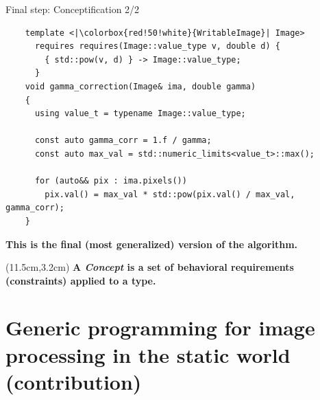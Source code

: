 \documentclass[12pt,aspectratio=169]{beamer}
\begin{document}
\begin{frame}[fragile]{Final step: Conceptification 2/2}
  \begin{verbatim}
    template <|\colorbox{red!50!white}{WritableImage}| Image>
      requires requires(Image::value_type v, double d) {
        { std::pow(v, d) } -> Image::value_type;
      }
    void gamma_correction(Image& ima, double gamma)
    {
      using value_t = typename Image::value_type;
    
      const auto gamma_corr = 1.f / gamma;
      const auto max_val = std::numeric_limits<value_t>::max();
    
      for (auto&& pix : ima.pixels())
        pix.val() = max_val * std::pow(pix.val() / max_val, gamma_corr);
    }
  \end{verbatim}
  \vfill
  \begin{center}\textbf{This is the final (most generalized) version of the algorithm.}\end{center}
  \begin{textblock*}{4cm}(11.5cm,3.2cm)
    \textbf{A \emph{Concept} is a set of behavioral requirements (constraints) applied to a type.}
  \end{textblock*}
  \pdfcomment[icon=Note]{   }
\end{frame}

%
%
%
\section[Generic programming for image processing in the static world (contribution)]{Generic programming for image processing in the static world (contribution)}
\end{document}
